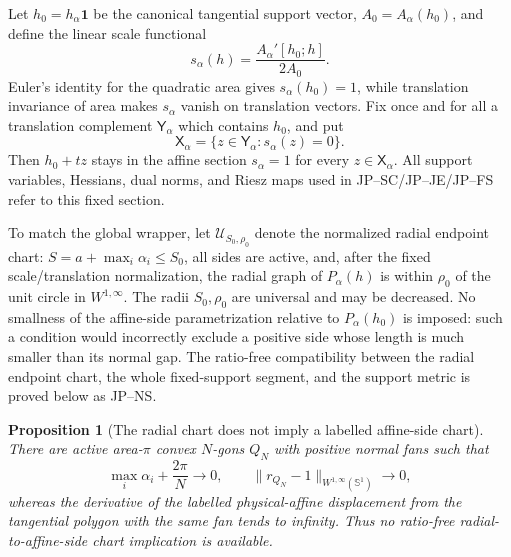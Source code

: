 \documentclass[11pt]{amsart}
\numberwithin{equation}{section}
\newtheorem{proposition}[theorem]{Proposition}
\theoremstyle{definition}
\theoremstyle{remark}
\begin{document}
Let $h_0=h_\alpha\mathbf1$ be the canonical tangential support vector,
$A_0=A_\alpha(h_0)$, and define the linear scale functional
\begin{equation}\label{JP:eq:scale-section}
 s_\alpha(h)=\frac{A_\alpha'[h_0;h]}{2A_0}.
\end{equation}
Euler's identity for the quadratic area gives $s_\alpha(h_0)=1$, while
translation invariance of area makes $s_\alpha$ vanish on translation
vectors.  Fix once and for all a translation complement
$\mathsf Y_\alpha$ which contains $h_0$, and put
\begin{equation}\label{JP:eq:Xalpha}
 \mathsf X_\alpha=\{z\in\mathsf Y_\alpha:s_\alpha(z)=0\}.
\end{equation}
Then $h_0+tz$ stays in the affine section $s_\alpha=1$ for every
$z\in\mathsf X_\alpha$.  All support variables, Hessians, dual norms, and
Riesz maps used in JP--SC/JP--JE/JP--FS refer to this fixed section.

To match the global wrapper, let $\mathcal U_{S_0,\rho_0}$ denote the
normalized radial endpoint chart: $S=a+\max_i\alpha_i\le S_0$, all sides
are active, and, after the fixed scale/translation normalization, the
radial graph of $P_\alpha(h)$ is within $\rho_0$ of the unit circle in
$W^{1,\infty}$.  The radii $S_0,\rho_0$ are universal and may be
decreased.  No smallness of the affine-side parametrization relative to
$P_\alpha(h_0)$ is imposed: such a condition would incorrectly exclude a
positive side whose length is much smaller than its normal gap.  The
ratio-free compatibility between the radial endpoint chart, the whole
fixed-support segment, and the support metric is proved below as JP--NS.

\begin{proposition}[The radial chart does not imply a labelled affine-side chart]
\label{JP:prop:radial-not-affine}
There are active area-$\pi$ convex $N$-gons $Q_N$ with positive normal
fans such that
\[
 \max_i\alpha_i+\frac{2\pi}{N}\longrightarrow0,
 \qquad \|r_{Q_N}-1\|_{W^{1,\infty}(\mathbb S^1)}\longrightarrow0,
\]
whereas the derivative of the labelled physical-affine displacement from
the tangential polygon with the same fan tends to infinity.  Thus no
ratio-free radial-to-affine-side chart implication is available.
\end{proposition}
\end{document}
